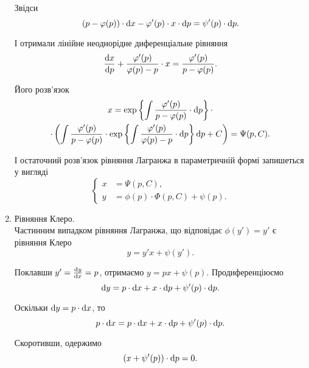 \begin{enumerate}
	Звідси
	\begin{equation*}
		(p - \varphi(p)) \cdot \mathop{}\!\mathrm{d} x - \varphi'(p) \cdot x \cdot \mathop{}\!\mathrm{d} p = \psi'(p) \cdot \mathop{}\!\mathrm{d} p.
	\end{equation*}
	
	І отримали лінійне неоднорідне диференціальне рівняння
	\begin{equation*}
		\frac{\mathop{}\!\mathrm{d} x}{\mathop{}\!\mathrm{d} p} + \frac{\varphi'(p)}{\varphi(p)-p} \cdot x = \frac{\varphi'(p)}{p-\varphi(p)}.
	\end{equation*}
	
	Його роз\-в'яз\-ок
	\begin{multline*}
		x = \exp\left\{\int \frac{\varphi'(p)}{p-\varphi(p)} \cdot \mathop{}\!\mathrm{d} p\right\} \cdot \\
		\cdot \left(\int \frac{\varphi'(p)}{p-\varphi(p)} \cdot \exp\left\{\int \frac{\varphi'(p)}{\varphi(p)-p} \cdot \mathop{}\!\mathrm{d} p\right\} \mathop{}\!\mathrm{d} p + C \right) = \Psi(p, C).
	\end{multline*}
	
	І остаточний розв'язок рівняння Лагранжа в параметричній формі запишеться у вигляді
	\begin{equation*}
		\left\{
			\begin{aligned}
				x &= \Psi(p,C), \\
				y &= \phi(p) \cdot \Phi(p, C) + \psi(p).
			\end{aligned}
		\right.
	\end{equation*}
	
	\item Рівняння Клеро. \\

	Частинним випадком рівняння Лагранжа, що відповідає $\phi(y') = y'$ є рівняння Клеро
 	\begin{equation*}
 		y = y' x + \psi(y').
 	\end{equation*}
	
	Поклавши $y' = \frac{\mathop{}\!\mathrm{d} y}{\mathop{}\!\mathrm{d} x} = p$, отримаємо $y = p x + \psi(p)$. Продиференціюємо 
	\begin{equation*}
		\mathop{}\!\mathrm{d} y = p \cdot \mathop{}\!\mathrm{d} x + x \cdot \mathop{}\!\mathrm{d} p + \psi'(p) \cdot \mathop{}\!\mathrm{d} p.
	\end{equation*}
	
	Оскільки $\mathop{}\!\mathrm{d} y = p \cdot \mathop{}\!\mathrm{d} x$, то
	\begin{equation*}
		p \cdot \mathop{}\!\mathrm{d} x = p \cdot \mathop{}\!\mathrm{d} x + x \cdot \mathop{}\!\mathrm{d} p + \psi'(p) \cdot \mathop{}\!\mathrm{d} p.
	\end{equation*}
	
	Скоротивши, одержимо
	\begin{equation*}
		(x + \psi'(p)) \cdot \mathop{}\!\mathrm{d} p = 0.
	\end{equation*}
	

\end{enumerate}
